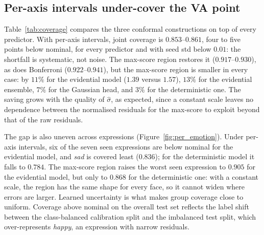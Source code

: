 \subsection{Per-axis intervals under-cover the VA point}
Table~\ref{tab:coverage} compares the three conformal constructions on top of
every predictor. With per-axis intervals, joint coverage is $0.853$--$0.861$,
four to five points below nominal, for every predictor and with seed std below
$0.01$: the shortfall is systematic, not noise. The max-score region restores it
($0.917$--$0.930$), as does Bonferroni ($0.922$--$0.941$), but the max-score
region is smaller in every case: by $11\%$ for the evidential model ($1.39$
versus $1.57$), $13\%$ for the evidential ensemble, $7\%$ for the Gaussian head,
and $3\%$ for the deterministic one. The saving grows with the quality of
$\hat\sigma$, as expected, since a constant scale leaves no dependence between
the normalised residuals for the max-score to exploit beyond that of the raw
residuals.

The gap is also uneven across expressions (Figure~\ref{fig:per_emotion}). Under
per-axis intervals, six of the seven seen expressions are below nominal for the
evidential model, and \emph{sad} is covered least ($0.836$); for the
deterministic model it falls to $0.784$. The max-score region raises the
worst seen expression to $0.905$ for the evidential model, but only to $0.868$
for the deterministic one: with a constant scale, the region has the same shape
for every face, so it cannot widen where errors are larger. Learned
uncertainty is what makes group coverage close to uniform. Coverage above
nominal on the overall test set reflects the label shift between the
class-balanced calibration split and the imbalanced test split, which
over-represents \emph{happy}, an expression with narrow residuals.

\begin{table}[h]
  \centering\small
  \resizebox{\linewidth}{!}{}
  \caption{Conformal regions at nominal $90\%$, calibrated on validation. Joint:
  fraction of seen test faces whose true VA point lies in the region. Area: mean
  region area in VA units. Worst: lowest joint coverage across the seven seen
  expressions. Shift: joint coverage on corrupted test images, with the quantile
  calibrated on clean data.}
  \label{tab:coverage}
\end{table}

